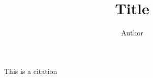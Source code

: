 \documentclass[12pt,man,floatsintext,a4paper,donotrepeattitle]{apa7} %
\title{Title}
\author{Author}
\affiliation{Author Affiliation}
\begin{document}
\maketitle
\tableofcontents
\newpage


This is a citation \citep{Olejniczak2019}

\newpage

\end{document}

